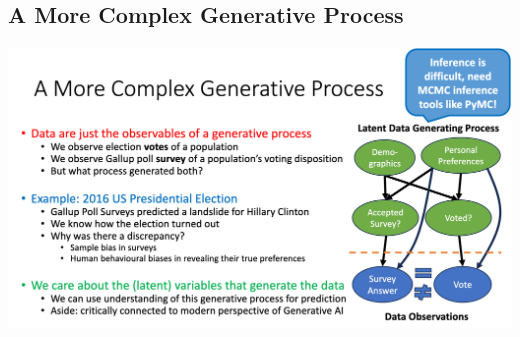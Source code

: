 \documentclass[11pt]{article}
\theoremstyle{definition}
\begin{document}
\subsection{A More Complex Generative Process}
\includegraphics[width=\textwidth/2]{12.png}
\end{document}
